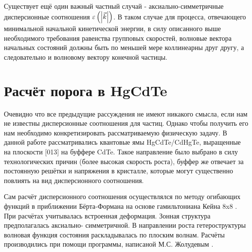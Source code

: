 \documentclass[../main.tex]{subfiles}
\begin{document}




    Существует ещё один важный частный случай - аксиально-симметричные дисперсионные
    соотношения $\varepsilon\left(\abs{\vec k}\right)$. В таком случае для процесса,
    отвечающего минимальной начальной кинетической энергии, в силу описанного выше 
    необходимого требования равенства групповых скоростей, волновые вектора начальных
    состояний должны быть по меньшей мере коллинеарны друг другу, а следовательно и 
    волновому вектору конечной частицы.

    \section{Расчёт порога в HgCdTe}

        Очевидно что все предыдущие рассуждения не имеют никакого смысла, если нам не известны дисперсионные 
        соотношения для частиц. Однако чтобы получить его нам необходимо конкретизировать
        рассматриваемую физическую задачу. В данной работе рассматривались квантовые ямы HgCdTe/CdHgTe, выращенные 
        на плоскости [013] на буффере CdTe. Такое направление было выбрано в силу технологических причин (более
        высокая скорость роста), буффер же отвечает за постоянную решётки и напряжения в кристалле,
        которые могут существенно повлиять на вид дисперсионного соотношения.

        Сам расчёт дисперсионного соотношения осуществлялся по методу огибающих функций
        в приближении Бёрта-Формана на основе гамильтониана Кейна 8x8 \cite{Novik:2005}. При расчётах
        учитывалась встроенная деформация. Зонная структура предполагалась аксиально-
        симметричной. В направлении роста гетероструктуры волновая функция состояния
        раскладывалась по плоским волнам. Расчёты производились при помощи программы,
        написаной М.С. Жолудевым \cite{Zholudev:PRB:2012}.
\end{document}
